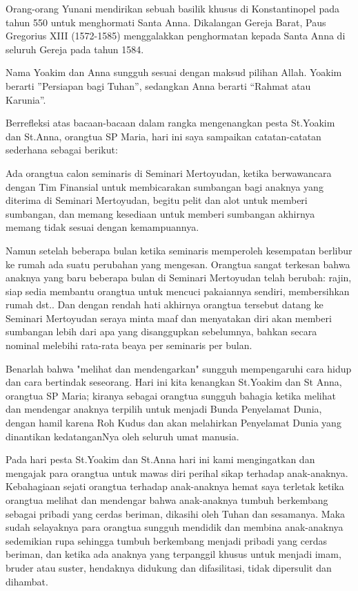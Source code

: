 \documentclass[a5paper,headsepline,titlepage,12pt,nnormalheadings,DIVcalc]{scrbook}
\begin{document}
Orang-orang Yunani mendirikan sebuah basilik khusus di Konstantinopel pada tahun 550 untuk menghormati Santa Anna. Dikalangan Gereja Barat, Paus Gregorius XIII (1572-1585) menggalakkan penghormatan kepada Santa Anna di seluruh Gereja pada tahun 1584.

Nama Yoakim dan Anna sungguh sesuai dengan maksud pilihan Allah. Yoakim berarti ”Persiapan bagi Tuhan”, sedangkan Anna berarti “Rahmat atau Karunia”.


Berrefleksi atas bacaan-bacaan dalam rangka mengenangkan pesta St.Yoakim dan St.Anna, orangtua SP Maria, hari ini saya sampaikan catatan-catatan sederhana sebagai berikut:

Ada orangtua calon seminaris di Seminari Mertoyudan, ketika berwawancara dengan Tim Finansial untuk membicarakan sumbangan bagi anaknya yang diterima di Seminari Mertoyudan, begitu pelit dan alot untuk memberi sumbangan, dan memang kesediaan untuk memberi sumbangan akhirnya memang tidak sesuai dengan kemampuannya. 

Namun setelah beberapa bulan ketika seminaris memperoleh kesempatan berlibur ke rumah ada suatu perubahan yang mengesan. Orangtua sangat terkesan bahwa anaknya yang baru beberapa bulan di Seminari Mertoyudan telah berubah: rajin, siap sedia membantu orangtua untuk mencuci pakaiannya sendiri, membersihkan rumah dst.. Dan dengan rendah hati akhirnya orangtua tersebut datang ke Seminari Mertoyudan seraya minta maaf dan menyatakan diri akan memberi sumbangan lebih dari apa yang disanggupkan sebelumnya, bahkan secara nominal melebihi rata-rata beaya per seminaris per bulan. 

Benarlah bahwa "melihat dan mendengarkan" sungguh mempengaruhi cara hidup dan cara bertindak seseorang. Hari ini kita kenangkan St.Yoakim dan St Anna, orangtua SP Maria; kiranya sebagai orangtua sungguh bahagia ketika melihat dan mendengar anaknya terpilih untuk menjadi Bunda Penyelamat Dunia, dengan hamil karena Roh Kudus dan akan melahirkan Penyelamat Dunia yang dinantikan kedatanganNya oleh seluruh umat manusia. 

Pada hari pesta St.Yoakim dan St.Anna hari ini kami mengingatkan dan mengajak para orangtua untuk mawas diri perihal sikap terhadap anak-anaknya. Kebahagiaan sejati orangtua terhadap anak-anaknya hemat saya terletak ketika orangtua melihat dan mendengar bahwa anak-anaknya tumbuh berkembang sebagai pribadi yang cerdas beriman, dikasihi oleh Tuhan dan sesamanya. Maka sudah selayaknya para orangtua sungguh mendidik dan membina anak-anaknya sedemikian rupa sehingga tumbuh berkembang menjadi pribadi yang cerdas beriman, dan ketika ada anaknya yang terpanggil khusus untuk menjadi imam, bruder atau suster, hendaknya didukung dan difasilitasi, tidak dipersulit dan dihambat.
\end{document}
